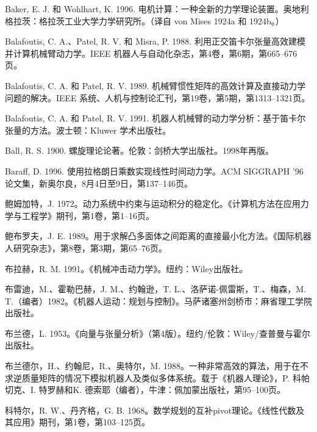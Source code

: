 \documentclass[10pt,a4paper]{book}
\theoremstyle{thmstyle} %
\theoremstyle{defstyle} %
\theoremstyle{prostyle} %
\begin{document}
Baker, E. J. 和 Wohlhart, K. 1996. 电机计算：一种全新的力学理论装置。奥地利格拉茨：格拉茨工业大学力学研究所。（译自 von Mises 1924a 和 1924b。）



Balafoutis, C. A.、Patel, R. V. 和 Misra, P. 1988. 利用正交笛卡尔张量高效建模并计算机械臂动力学。IEEE 机器人与自动化杂志，第4卷，第6期，第665–676页。



Balafoutis, C. A. 和 Patel, R. V. 1989. 机械臂惯性矩阵的高效计算及直接动力学问题的解决。IEEE 系统、人机与控制论汇刊，第19卷，第5期，第1313–1321页。



Balafoutis, C. A. 和 Patel, R. V. 1991. 机器人机械臂的动力学分析：基于笛卡尔张量的方法。波士顿：Kluwer 学术出版社。



Ball, R. S. 1900. 螺旋理论论著。伦敦：剑桥大学出版社。1998年再版。



Baraff, D. 1996. 使用拉格朗日乘数实现线性时间动力学。ACM SIGGRAPH '96 论文集，新奥尔良，8月4日至9日，第137–146页。



鲍姆加特，J. 1972。动力系统中约束与运动积分的稳定化。《计算机方法在应用力学与工程学》期刊，第1卷，第1–16页。



鲍布罗夫，J. E. 1989。用于求解凸多面体之间距离的直接最小化方法。《国际机器人研究杂志》，第8卷，第3期，第65–76页。



布拉赫，R. M. 1991。《机械冲击动力学》。纽约：Wiley出版社。



布雷迪，M.、霍勒巴赫，J. M.、约翰逊，T. L.、洛萨诺-佩雷斯，T.、梅森，M. T.（编者）1982。《机器人运动：规划与控制》。马萨诸塞州剑桥市：麻省理工学院出版社。



布兰德，L. 1953。《向量与张量分析》（第4版）。纽约/伦敦：Wiley/查普曼与霍尔出版社。



布兰德尔，H.、约翰尼，R.、奥特尔，M. 1988。一种非常高效的算法，用于在不求逆质量矩阵的情况下模拟机器人及类似多体系统。载于《机器人理论》，P. 科帕切克、I. 特罗赫和K. 德索耶（编者），牛津：佩加蒙出版社，第95–100页。



科特尔，R. W.、丹齐格，G. B. 1968。数学规划的互补pivot理论。《线性代数及其应用》期刊，第1卷，第103–125页。
\end{document}

